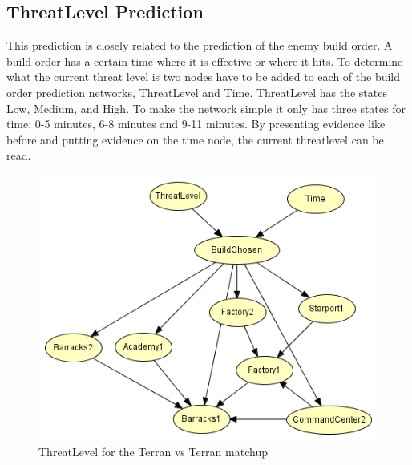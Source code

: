 			
\subsection{ThreatLevel Prediction}
	This prediction is closely related to the prediction of the enemy build order. A build order has a certain time where it is effective 
	or where it hits. To determine what the current threat level is two nodes have to be added to each of the build order prediction networks, 
	ThreatLevel and Time. ThreatLevel has the states Low, Medium, and High. To make the network simple it only has three states for time: 0-5 minutes, 
	6-8 minutes and 9-11 minutes. By presenting evidence like before and putting evidence on the time node, the current threatlevel can be read.
\begin{figure}[H]
	\includegraphics[scale=1]{Figures/BayesianPictures/threatlevel.png}
	\caption{ThreatLevel for the Terran vs Terran matchup}
	\label{fig:threatlevel}
\end{figure}	










 
